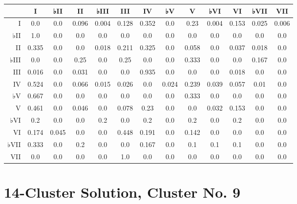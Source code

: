 \begin{table}[htbp]
\begin{minipage}{\linewidth}
\setlength{\tymax}{0.5\linewidth}
\centering
\small
\begin{tabulary}{\textwidth}{@{}RCCCCCCCCCCCC@{}} \toprule
&I&♭II&II&♭III&III&IV&♭V&V&♭VI&VI&♭VII&VII\\
\midrule
I&0.0&0.0&0.096&0.004&0.128&0.352&0.0&0.23&0.004&0.153&0.025&0.006\\
♭II&1.0&0.0&0.0&0.0&0.0&0.0&0.0&0.0&0.0&0.0&0.0&0.0\\
II&0.335&0.0&0.0&0.018&0.211&0.325&0.0&0.058&0.0&0.037&0.018&0.0\\
♭III&0.0&0.0&0.25&0.0&0.25&0.0&0.0&0.333&0.0&0.0&0.167&0.0\\
III&0.016&0.0&0.031&0.0&0.0&0.935&0.0&0.0&0.0&0.018&0.0&0.0\\
IV&0.524&0.0&0.066&0.015&0.026&0.0&0.024&0.239&0.039&0.057&0.01&0.0\\
♭V&0.667&0.0&0.0&0.0&0.0&0.0&0.0&0.333&0.0&0.0&0.0&0.0\\
V&0.461&0.0&0.046&0.0&0.078&0.23&0.0&0.0&0.032&0.153&0.0&0.0\\
♭VI&0.2&0.0&0.0&0.2&0.0&0.2&0.0&0.2&0.0&0.2&0.0&0.0\\
VI&0.174&0.045&0.0&0.0&0.448&0.191&0.0&0.142&0.0&0.0&0.0&0.0\\
♭VII&0.333&0.0&0.2&0.0&0.0&0.167&0.0&0.1&0.1&0.1&0.0&0.0\\
VII&0.0&0.0&0.0&0.0&1.0&0.0&0.0&0.0&0.0&0.0&0.0&0.0\\

\bottomrule

\end{tabulary}
\end{minipage}
\end{table}

\section{14-Cluster Solution, Cluster No. 9}
\label{14-clustersolutionclusterno.9}

